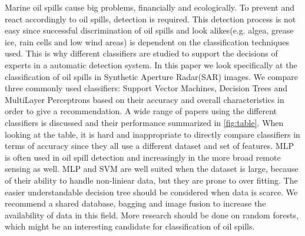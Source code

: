 Marine oil spills cause big problems, financially and ecologically. To prevent and react accordingly to oil spills, detection is required. This detection process is not easy since successful discrimination of oil spills and look alikes(e.g. algea, grease ice, rain cells and low wind areas) is dependent on the classification techniques used. This is why different classifiers are studied to support the decisions of experts in a automatic detection system. In this paper we look specifically at the classification of oil spills in Synthetic Aperture Radar(SAR) images. We compare three commonly used classifiers: Support Vector Machines, Decision Trees and MultiLayer Perceptrons based on their accuracy and overall characteristics in order to give a recommendation. A wide range of papers using the different classifiers is discussed and their performance summarized in \ref{fig:table}. When looking at the table, it is hard and inappropriate to directly compare classifiers in terms of accuracy since they all use a different dataset and set of features. MLP is often used in oil spill detection and increasingly in the more broad remote sensing as well. MLP and SVM are well suited when the dataset is large, because of their ability to handle non-liniear data, but they are prone to over fitting. The easier understandable decision tree should be considered when data is scarce. We recommend a shared database, bagging and image fusion to increase the availability of data in this field. More research should be done on random forests, which might be an interesting candidate for classification of oil spills.

